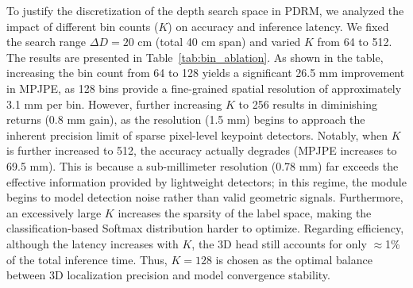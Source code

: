 \documentclass[journal]{IEEEtran}
\begin{document}
To justify the discretization of the depth search space in PDRM, we analyzed the impact of different bin counts ($K$) on accuracy and inference latency. We fixed the search range $\Delta D=20$ cm (total 40 cm span) and varied $K$ from 64 to 512. The results are presented in Table~\ref{tab:bin_ablation}. As shown in the table, increasing the bin count from 64 to 128 yields a significant 26.5 mm improvement in MPJPE, as 128 bins provide a fine-grained spatial resolution of approximately 3.1 mm per bin. However, further increasing $K$ to 256 results in diminishing returns (0.8 mm gain), as the resolution (1.5 mm) begins to approach the inherent precision limit of sparse pixel-level keypoint detectors. Notably, when $K$ is further increased to 512, the accuracy actually degrades (MPJPE increases to 69.5 mm). This is because a sub-millimeter resolution (0.78 mm) far exceeds the effective information provided by lightweight detectors; in this regime, the module begins to model detection noise rather than valid geometric signals. Furthermore, an excessively large $K$ increases the sparsity of the label space, making the classification-based Softmax distribution harder to optimize. Regarding efficiency, although the latency increases with $K$, the 3D head still accounts for only $\approx$1\% of the total inference time. Thus, $K=128$ is chosen as the optimal balance between 3D localization precision and model convergence stability.

\begin{table}[htbp]
    \centering
    \caption{Ablation study on the bin count $K$ in the PDRM module (evaluated on the BMP dataset).}
    \label{tab:bin_ablation}
    \renewcommand{\arraystretch}{1.3}
    \setlength{\tabcolsep}{4pt}
\end{table}
\end{document}
